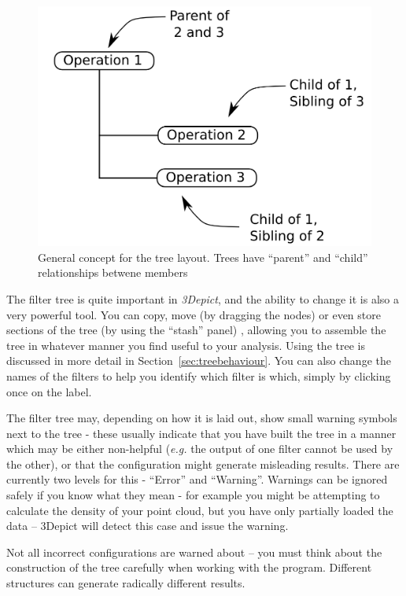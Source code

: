 \documentclass[10pt]{article}
\begin{document}
\begin{figure}[ht]
  \centering
 \includegraphics[width=0.6 \textwidth,keepaspectratio=true]{./figures/tree-layout.png}

 \caption{General concept for the tree layout. Trees have ``parent'' and ``child'' relationships betwene members}
\label{fig:treelayout}
\end{figure}

The filter tree is quite important in \emph{3Depict}, and the ability to change it is also a very powerful tool. You can copy, move (by dragging the nodes) or even store sections of the tree (by using the ``stash'' panel) , allowing you to assemble the tree in whatever manner you find useful to your analysis. Using the tree is discussed in more detail in Section~\ref{sec:treebehaviour}. You can also change the names of the filters to help you identify which filter is which, simply by clicking once on the label.

The filter tree may, depending on how it is laid out, show small warning symbols next to the tree - these usually indicate that you have built the tree in a manner which may be either non-helpful (\emph{e.g.} the output of one filter cannot be used by the other), or that the configuration might generate misleading results. There are currently two levels for this - ``Error'' and ``Warning''. Warnings can be ignored safely if you know what they mean - for example you might be attempting to calculate the density of your point cloud, but you have only partially loaded the data -- 3Depict will detect this case and issue the warning.

Not all incorrect configurations are warned about -- you must think about the construction of the tree carefully when working with the program. Different structures can generate radically different results.




\FloatBarrier
\end{document}
